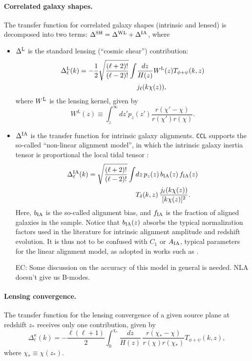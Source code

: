 \documentclass[\docopts]{\docclass}
\newcommand{\elisa}[1]{\textcolor{green!10!orange!90!}{EC: #1}}
\newcommand{\ccl}{{\tt CCL}\xspace}
\begin{document}
\paragraph{\bf Correlated galaxy shapes.} The transfer function for correlated galaxy shapes (intrinsic and lensed) is decomposed into two terms: $\Delta^{\rm SH}=\Delta^{\rm WL}+\Delta^{\rm IA}$, where
\begin{itemize}
  \item $\Delta^{\rm L}$ is the standard lensing (``cosmic shear'') contribution:
    \begin{align} \label{eq:transfer_lensing}
      \nonumber
      \Delta_\ell^{\rm L}(k)=-\frac{1}{2}\sqrt{\frac{(\ell+2)!}{(\ell-2)!}}\int &\frac{dz}{H(z)} W^{\rm L}(z)T_{\phi+\psi}(k,z)\\
      &j_\ell(k\chi(z)),
    \end{align}
    where $W^{\rm L}$ is the lensing kernel, given by
    \begin{equation}
      W^L(z)\equiv\int_z^\infty dz' p_z(z')\frac{r(\chi'-\chi)}{r(\chi')r(\chi)}.
    \end{equation}
  \item $\Delta^{\rm IA}$ is the transfer function for intrinsic galaxy alignments. \ccl supports the so-called ``non-linear alignment model'', in which the intrinsic galaxy inertia tensor is proportional the local tidal tensor \citep{2004PhRvD..70f3526H,2007MNRAS.381.1197H}:
    \begin{align}\nonumber
      \Delta_\ell^{\rm IA}(k)=\sqrt{\frac{(\ell+2)!}{(\ell-2)!}}\int &dz\,p_z(z)\,b_{\rm IA}(z)\,f_{\rm IA}(z)\\
      &T_\delta(k,z)\,\frac{j_\ell(k\chi(z))}{[k\chi(z)]^2}.
    \end{align}
    Here, $b_{\rm IA}$ is the so-called alignment bias, and $f_{\rm IA}$ is the fraction of aligned galaxies in the sample. Notice that $b_{\rm IA}(z)$ absorbs the typical normalization factors used in the literature for intrinsic alignment amplitude and redshift evolution. It is thus not to be confused with $C_1$ or $A_{\rm IA}$, typical parameters for the linear alignment model, as adopted in works such as \citet{Blazek17,vanUitert18,Joudaki18,Hildebrandt17}.

    \elisa{Some discussion on the accuracy of this model in general is needed. NLA doesn't give us B-modes.}
    
\end{itemize}

\paragraph{\bf Lensing convergence.} The transfer function for the lensing convergence of a given source plane at redshift $z_*$ receives only one contribution, given by
\begin{equation}
  \Delta_\ell^\kappa(k)=-\frac{\ell(\ell+1)}{2}\int_0^{\chi_*}\frac{dz}{H(z)}\,\frac{r(\chi_*-\chi)}{r(\chi)r(\chi_*)}T_{\phi+\psi}(k,z),
  \label{eq:cmblens}
\end{equation}
where $\chi_*\equiv\chi(z_*)$.
\end{document}
